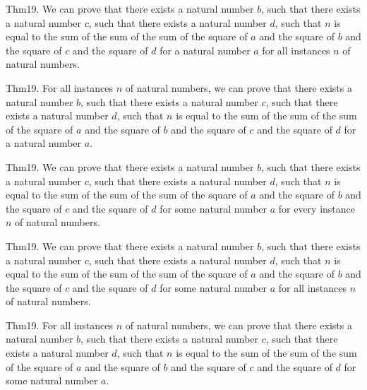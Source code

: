 \documentclass{article}
\begin{document}
Thm19. We can prove that there exists a natural number $b$, such that there exists a natural number $c$, such that there exists a natural number $d$, such that $n$ is equal to the sum of the sum of the sum of the square of $a$ and the square of $b$ and the square of $c$ and the square of $d$ for a natural number $a$ for all instances $n$ of natural numbers.

Thm19. For all instances $n$ of natural numbers, we can prove that there exists a natural number $b$, such that there exists a natural number $c$, such that there exists a natural number $d$, such that $n$ is equal to the sum of the sum of the sum of the square of $a$ and the square of $b$ and the square of $c$ and the square of $d$ for a natural number $a$.

Thm19. We can prove that there exists a natural number $b$, such that there exists a natural number $c$, such that there exists a natural number $d$, such that $n$ is equal to the sum of the sum of the sum of the square of $a$ and the square of $b$ and the square of $c$ and the square of $d$ for some natural number $a$ for every instance $n$ of natural numbers.

Thm19. We can prove that there exists a natural number $b$, such that there exists a natural number $c$, such that there exists a natural number $d$, such that $n$ is equal to the sum of the sum of the sum of the square of $a$ and the square of $b$ and the square of $c$ and the square of $d$ for some natural number $a$ for all instances $n$ of natural numbers.

Thm19. For all instances $n$ of natural numbers, we can prove that there exists a natural number $b$, such that there exists a natural number $c$, such that there exists a natural number $d$, such that $n$ is equal to the sum of the sum of the sum of the square of $a$ and the square of $b$ and the square of $c$ and the square of $d$ for some natural number $a$.
\end{document}
